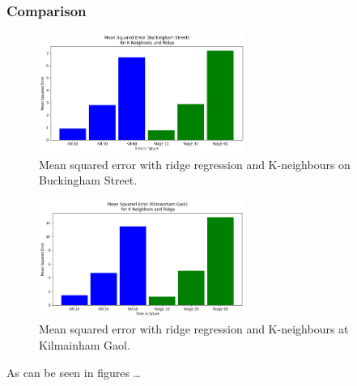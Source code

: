 \subsubsection{Comparison}
\begin{figure}[H]
    \centering
    \includegraphics[width=0.6\textwidth]{images/mse5.png}
    \caption{Mean squared error with ridge regression and K-neighbours  on Buckingham Street.}
    \end{figure}
\par

\begin{figure}[H]
    \centering
    \includegraphics[width=0.6\textwidth]{images/mse6.png}
    \caption{Mean squared error with ridge regression and K-neighbours at Kilmainham Gaol.}
    \end{figure}
\par

As can be seen in figures \dots 